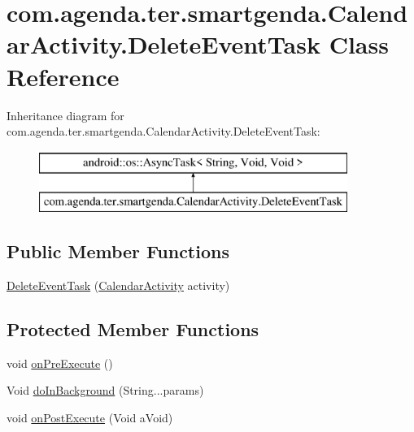 \hypertarget{classcom_1_1agenda_1_1ter_1_1smartgenda_1_1_calendar_activity_1_1_delete_event_task}{\section{com.\-agenda.\-ter.\-smartgenda.\-Calendar\-Activity.\-Delete\-Event\-Task Class Reference}
\label{classcom_1_1agenda_1_1ter_1_1smartgenda_1_1_calendar_activity_1_1_delete_event_task}
}
Inheritance diagram for com.\-agenda.\-ter.\-smartgenda.\-Calendar\-Activity.\-Delete\-Event\-Task\-:\begin{figure}[H]
\begin{center}
\leavevmode
\includegraphics[height=2.000000cm]{classcom_1_1agenda_1_1ter_1_1smartgenda_1_1_calendar_activity_1_1_delete_event_task}
\end{center}
\end{figure}
\subsection*{Public Member Functions}
\begin{DoxyCompactItemize}
\item 
\hyperlink{classcom_1_1agenda_1_1ter_1_1smartgenda_1_1_calendar_activity_1_1_delete_event_task_a1e3d81148575fc086236b30bd67865c9}{Delete\-Event\-Task} (\hyperlink{classcom_1_1agenda_1_1ter_1_1smartgenda_1_1_calendar_activity}{Calendar\-Activity} activity)
\end{DoxyCompactItemize}
\subsection*{Protected Member Functions}
\begin{DoxyCompactItemize}
\item 
void \hyperlink{classcom_1_1agenda_1_1ter_1_1smartgenda_1_1_calendar_activity_1_1_delete_event_task_a58da9fb76b408ee5b5514820a6450d78}{on\-Pre\-Execute} ()
\item 
Void \hyperlink{classcom_1_1agenda_1_1ter_1_1smartgenda_1_1_calendar_activity_1_1_delete_event_task_a1673258616a805f25e11c8f3023c1b7a}{do\-In\-Background} (String...\-params)
\item 
void \hyperlink{classcom_1_1agenda_1_1ter_1_1smartgenda_1_1_calendar_activity_1_1_delete_event_task_a1d4f2bd510e3887c1aea28b71bacdc2f}{on\-Post\-Execute} (Void a\-Void)
\end{DoxyCompactItemize}



